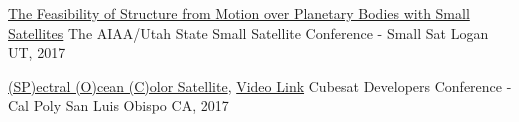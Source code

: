 \documentclass[10pt,a4paper]{article}
\begin{document}


\headedsection
  {{\color{bluegreen} \faTelevision} \href{http://smallsat.uga.edu/images/documents/presentations/Feasability_of_Structure_from_motion_over_planetary_bodies_using_small_satellites.pdf}{The Feasibility of Structure from Motion over Planetary Bodies with Small Satellites}}{%
  \headedsubsection
    {The AIAA/Utah State Small Satellite Conference - Small Sat}
    {Logan UT, 2017}
    {}
}


\headedsection
  {{\color{bluegreen} \faTelevision} \href{http://smallsat.uga.edu/images/documents/presentations/UGAWorkshop2017CubeSatDeveloper.pdf}{(SP)ectral (O)cean (C)olor Satellite}, \href{https://youtu.be/QDb6PAgxWv0?t=9846}{ {\color{bluegreen} \faYoutubePlay} Video Link}}{%
  \headedsubsection
    {Cubesat Developers Conference - Cal Poly}
    {San Luis Obispo CA, 2017}
    {}
}

\end{document}
